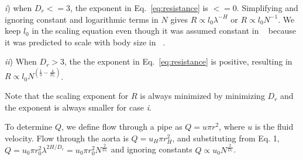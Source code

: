 \documentclass[12pt]{article}
\begin{document}
\emph{i})  when $D_r <= 3$, the exponent in Eq.~\ref{eq:resistance} is $<= 0$.
Simplifying and ignoring constant and logarithmic terms in $N$ gives  $R \propto l_0 \lambda^{-H} $ or  $R \propto l_0 N^{-1}$. We keep $l_0$ in the scaling equation even though it was assumed constant in ~\cite{west97} because it was predicted to scale with body size in ~\cite{banavar10}. 

\emph{ii}) When $D_r > 3$, the the exponent in Eq.~\ref{eq:resistance} is positive, resulting in $R \propto l_0 N^{(\frac{1}{3} - \frac{4}{D_r})}$. 

Note that the scaling exponent for $R$ is always minimized by minimizing $D_r$ and the exponent is always smaller for case \emph{i}.


%






To determine $Q$, we define flow through a pipe as $Q = u\pi r^2$, where $u$ is the fluid 
velocity. 
Flow through the aorta is
$Q = u_H \pi r_{H}^2$, and substituting from Eq. 1, $Q = u_0 \pi r_0^2
\lambda^{2H/D_r} = u_0 \pi r_0^2N^{\frac{2}{D_r}}$ and ignoring constants $Q \propto u_0 N^{\frac{2}{D_r}} $. 
\end{document}
